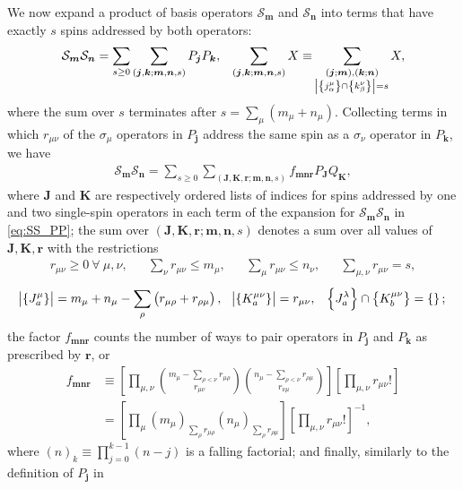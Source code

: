 \documentclass[aps,notitlepage,nofootinbib,11pt]{revtex4-1}
\newcommand{\p}[1]{\left(#1\right)} %
\renewcommand{\sp}[1]{\left[#1\right]} %
\renewcommand{\set}[1]{\left\{#1\right\}} %
\renewcommand{\v}{\bm} %
\renewcommand{\S}{\mathcal{S}}
\newcommand{\1}{\mathds{1}}
\begin{document}
We now expand a product of basis operators $\S_{\v m}$ and $\S_{\v n}$
into terms that have exactly $s$ spins addressed by both operators:
\begin{align}
  \S_{\v m} \S_{\v n}
  = \sum_{s\ge0} \sum_{\p{\v j,\v k;\v m,\v n,s}} P_{\v j} P_{\v k},
  &&
  \sum_{\p{\v j,\v k;\v m,\v n,s}} X \equiv
  \sum_{\substack{\p{\v j;\v m},\p{\v k;\v n} \\
      \abs{\set{j_\alpha^\mu}\cap\set{k_\beta^\nu}}=s}} X,
  \label{eq:SS_PP}
\end{align}
where the sum over $s$ terminates after $s = \sum_\mu\p{m_\mu+n_\mu}$.
Collecting terms in which $r_{\mu\nu}$ of the $\sigma_\mu$ operators
in $P_{\v j}$ address the same spin as a $\sigma_\nu$ operator in
$P_{\v k}$, we have
\begin{align}
  \S_{\v m}\S_{\v n}
  = \sum_{s\ge0} \sum_{\p{\v J,\v K,\v r;\v m,\v n,s}}
  f_{\v m\v n\v r} P_{\v J} Q_{\v K},
  \label{eq:SS_PQ}
\end{align}
where $\v J$ and $\v K$ are respectively ordered lists of indices for
spins addressed by one and two single-spin operators in each term of
the expansion for $\S_{\v m} \S_{\v n}$ in \eqref{eq:SS_PP}; the sum
over $\p{\v J,\v K,\v r;\v m,\v n,s}$ denotes a sum over all values of
$\v J,\v K,\v r$ with the restrictions
\begin{align}
  r_{\mu\nu} \ge 0 ~\forall~ \mu,\nu,
  &&
  \sum_\nu r_{\mu\nu} \le m_\mu,
  &&
  \sum_\mu r_{\mu\nu} \le n_\nu,
  &&
  \sum_{\mu,\nu} r_{\mu\nu} = s,
  \label{eq:rest_r}
\end{align}
\begin{align}
  \abs{\set{J_a^\mu}}
  = m_\mu + n_\mu - \sum_\rho\p{r_{\mu\rho}+r_{\rho\mu}},
  &&
  \abs{\set{K^{\mu\nu}_a}} = r_{\mu\nu},
  &&
  \set{J_a^\lambda} \cap \set{K_b^{\mu\nu}} = \set{};
\end{align}
the factor $f_{\v m\v n\v r}$ counts the number of ways to pair
operators in $P_{\v j}$ and $P_{\v k}$ as prescribed by $\v r$, or
\begin{align}
  f_{\v m\v n\v r}
  &\equiv \sp{\prod_{\mu,\nu}
    { m_\mu - \sum_{\rho<\nu} r_{\mu\rho} \choose r_{\mu\nu} }
    { n_\mu - \sum_{\rho<\nu} r_{\rho\mu} \choose r_{\nu\mu} }}
  \sp{\prod_{\mu,\nu} r_{\mu\nu}!} \\
  &= \sp{\prod_\mu \p{m_\mu}_{\sum_\rho r_{\mu\rho}}
    \p{n_\mu}_{\sum_\rho r_{\rho\mu}}}
  \sp{\prod_{\mu,\nu} r_{\mu\nu}!}^{-1},
\end{align}
where $\p{n}_k\equiv\prod_{j=0}^{k-1}\p{n-j}$ is a falling factorial;
and finally, similarly to the definition of $P_{\v j}$ in
\end{document}
